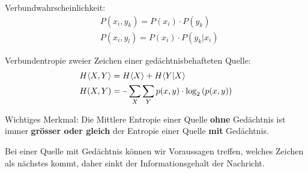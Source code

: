 Verbundwahrscheinlichkeit:
\begin{align*}
	&P(x_i, y_k) = P(x_i) \cdot P(y_k) \\
	&P(x_i, y_l) = P(x_i) \cdot P(y_k|x_i)
\end{align*}

Verbundentropie zweier Zeichen einer gedächtnisbehafteten Quelle:
\begin{align*}
	&H \langle X,Y \rangle = H \langle X \rangle + H \langle Y|X \rangle \\
	&H(X,Y) = \unaryminus \sum_X \sum_Y p(x,y) \cdot \log_2\left(p(x,y)\right)
\end{align*}

Wichtiges Merkmal: Die Mittlere Entropie einer Quelle \textbf{ohne} Gedächtnis
ist immer \textbf{grösser oder gleich} der Entropie einer Quelle \textbf{mit}
Gedächtnis.

Bei einer Quelle mit Gedächtnis können wir Voraussagen treffen, welches Zeichen
als nächstes kommt, daher sinkt der Informationsgehalt der Nachricht.
